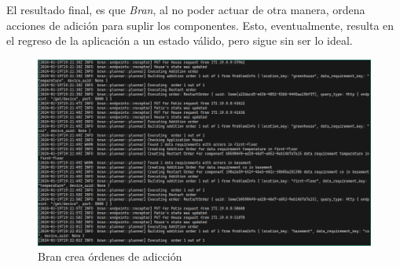 El resultado final, es que \textit{Bran}, al no poder actuar de otra manera, ordena acciones de adición para suplir los componentes. Esto, eventualmente, resulta en el regreso de la aplicación a un estado válido, pero sigue sin ser lo ideal.

\begin{figure}[H]
    \centering
    \caption{Bran crea órdenes de adicción}
    \label{fig:HadToAdd}
    \includegraphics[width=\linewidth]{images/ReLaunchIT.png}
    \vspace{-4mm}
\end{figure}